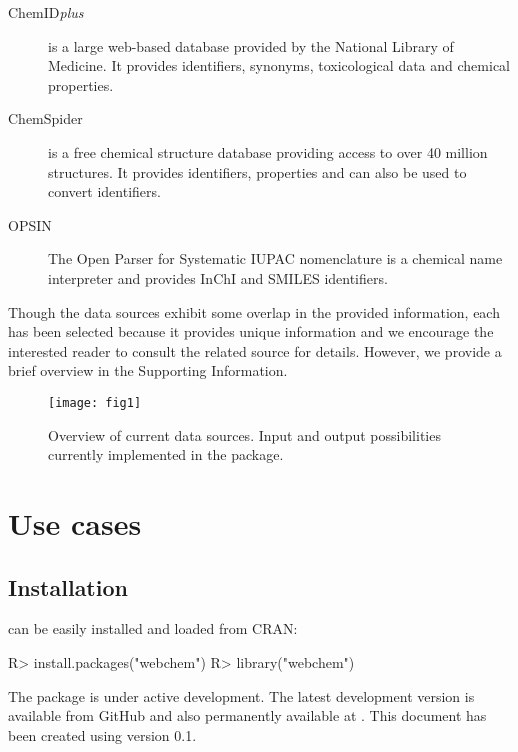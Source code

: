 \documentclass[article, shortnames]{jss}\usepackage[]{graphicx}\usepackage[]{color}
\providecommand{\DIFadd}[1]{{\protect\color{green}\uwave{#1}}} %
\providecommand{\DIFaddbegin}{} %
\providecommand{\DIFaddend}{} %
\providecommand{\DIFdelbegin}{} %
\providecommand{\DIFdelend}{} %
\begin{document}
\begin{description}
  \item[ChemID\emph{plus} \citep{Tomasulo_2002}]{is a large web-based database provided by the National Library of Medicine. It provides identifiers, synonyms, toxicological data and chemical properties.}
  \item[ChemSpider \citep{pence_chemspider:_2010}]{is a free chemical structure database providing access to over 40 million structures. It provides identifiers, properties and can also be used to convert identifiers.}
  \item[OPSIN  \citep{Lowe_Corbett_Murray-Rust_Glen_2011}]{The Open Parser for Systematic IUPAC nomenclature is a chemical name interpreter and provides InChI and SMILES identifiers.}
\end{description}

Though the data sources exhibit some overlap in the provided information, each has been selected because it \DIFaddbegin \DIFadd{also }\DIFaddend provides unique information and we encourage the interested reader to consult the related source for details. 
However, we provide a brief overview in the Supporting Information.

\begin{figure}[ht]
  \centering
  \texttt{[image: fig1]}
  \caption{Overview of current data sources. Input and output possibilities currently implemented in the package.}
  \label{fig:fig1}
\end{figure}


\section[Use cases]{Use cases}
\subsection[Install webchem]{Installation}
 can be easily installed and loaded from CRAN:

\begin{CodeChunk}
\begin{CodeInput}
R> install.packages("webchem")
R> library("webchem")
\end{CodeInput}
\end{CodeChunk}

\DIFaddbegin \begin{CodeChunk}
\end{CodeChunk}


\DIFaddend The package is under active development. The latest development version is available from GitHub and also permanently available at \DIFdelbegin %
\DIFdelend \DIFaddbegin \DIFadd{\mbox{%
\citet{zenodo}
}%
}\DIFaddend .
This document has been created using  version 0.1.
\end{document}
